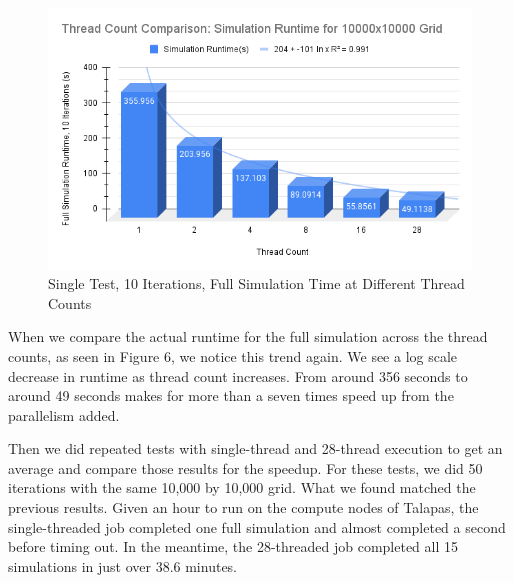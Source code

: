\documentclass[12pt]{article}
\begin{document}
\begin{figure}[htbp]
\centering
\includegraphics[width=\linewidth]{FlockingSimulation1.png}
\caption{\label{fig:flock_2}Single Test, 10 Iterations, Full Simulation Time at Different Thread Counts}
\end{figure}
\par When we compare the actual runtime for the full simulation across the thread counts, as seen in Figure 6, we notice this trend again. We see a log scale decrease in runtime as thread count increases. From around 356 seconds to around 49 seconds makes for more than a seven times speed up from the parallelism added. 
\par Then we did repeated tests with single-thread and 28-thread execution to get an average and compare those results for the speedup. For these tests, we did 50 iterations with the same 10,000 by 10,000 grid. What we found matched the previous results. Given an hour to run on the compute nodes of Talapas, the single-threaded job completed one full simulation and almost completed a second before timing out. In the meantime, the 28-threaded job completed all 15 simulations in just over 38.6 minutes. 
\end{document}
